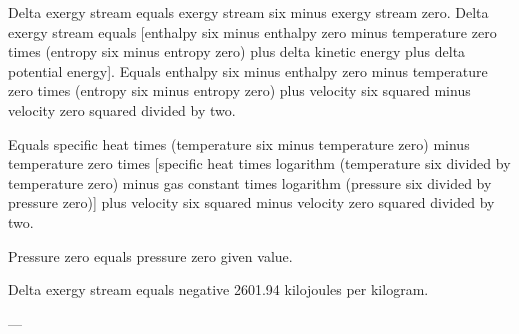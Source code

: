 Delta exergy stream equals exergy stream six minus exergy stream zero.  
Delta exergy stream equals [enthalpy six minus enthalpy zero minus temperature zero times (entropy six minus entropy zero) plus delta kinetic energy plus delta potential energy].  
Equals enthalpy six minus enthalpy zero minus temperature zero times (entropy six minus entropy zero) plus velocity six squared minus velocity zero squared divided by two.  

Equals specific heat times (temperature six minus temperature zero) minus temperature zero times [specific heat times logarithm (temperature six divided by temperature zero) minus gas constant times logarithm (pressure six divided by pressure zero)] plus velocity six squared minus velocity zero squared divided by two.  

Pressure zero equals pressure zero given value.  

Delta exergy stream equals negative 2601.94 kilojoules per kilogram.  

---